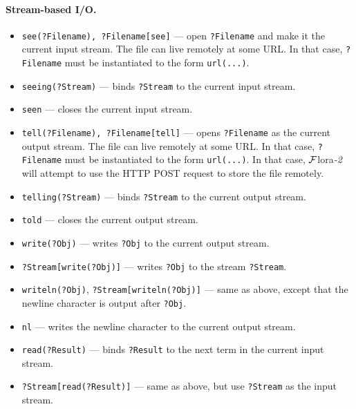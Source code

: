 \documentclass[11pt]{article}
\newcommand{\FLSYSTEM}{{\mbox{\sc ${\cal F}${lora}\rm\emph{-2}}}\xspace}
\begin{document}
\paragraph{Stream-based I/O.}
\begin{itemize}
\item  {\tt see(?Filename), ?Filename[see]} --- open {\tt ?Filename} and make it the
  current input stream.
  The file can live remotely at some URL. In that case, {\tt ?Filename}
  must be instantiated to the form {\tt url(...)}.  
\item {\tt seeing(?Stream)} --- binds {\tt ?Stream} to the current input
  stream.
\item {\tt seen} --- closes the current input stream.
\item {\tt tell(?Filename), ?Filename[tell]} --- opens {\tt ?Filename} as the current output
  stream. The file can live remotely at some URL. In that case, {\tt ?Filename}
  must be instantiated to the form {\tt url(...)}.
  In that case, \FLSYSTEM will attempt to use the HTTP POST request to store
  the file remotely.
\item {\tt telling(?Stream)} --- binds {\tt ?Stream} to the current output
  stream. 
\item {\tt told} --- closes the current output stream.
\item {\tt write(?Obj)} --- writes {\tt ?Obj} to the current output stream.
\item {\tt ?Stream[write(?Obj)]} --- writes {\tt ?Obj} to the stream {\tt ?Stream}.
\item {\tt writeln(?Obj)}, {\tt ?Stream[writeln(?Obj)]} --- same as above,
  except that the newline character is output after {\tt ?Obj}.
\item {\tt nl} --- writes the newline character to the current output
  stream.
\item {\tt read(?Result)} --- binds {\tt ?Result} to the next term in the
  current input stream.
\item {\tt ?Stream[read(?Result)]} --- same as above, but use {\tt ?Stream}
  as the input stream.
\end{itemize}
\end{document}
